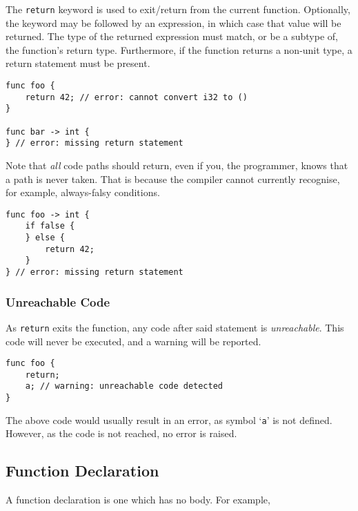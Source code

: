 \documentclass{article}
\begin{document}
    The \texttt{return} keyword is used to exit/return from the current function.
    Optionally, the keyword may be followed by an expression, in which case that value will be returned.
    The type of the returned expression must match, or be a subtype of, the function's return type.
    Furthermore, if the function returns a non-unit type, a return statement must be present.

    \begin{lstlisting}[language=CustomLang]
func foo {
    return 42; // error: cannot convert i32 to ()
}

func bar -> int {
} // error: missing return statement
    \end{lstlisting}

    Note that \textit{all} code paths should return, even if you, the programmer, knows that a path is never taken.
    That is because the compiler cannot currently recognise, for example, always-falsy conditions.

    \begin{lstlisting}[language=CustomLang]
func foo -> int {
    if false {
    } else {
        return 42;
    }
} // error: missing return statement
    \end{lstlisting}

    \subsubsection{Unreachable Code}

    As \texttt{return} exits the function, any code after said statement is \textit{unreachable}.
    This code will never be executed, and a warning will be reported.

    \begin{lstlisting}[language=CustomLang]
func foo {
    return;
    a; // warning: unreachable code detected
}
    \end{lstlisting}

    The above code would usually result in an error, as symbol `\texttt{a}' is not defined.
    However, as the code is not reached, no error is raised.

    \subsection{Function Declaration}\label{subsec:function-declaration}

    A function declaration is one which has no body.
    For example,
\end{document}
